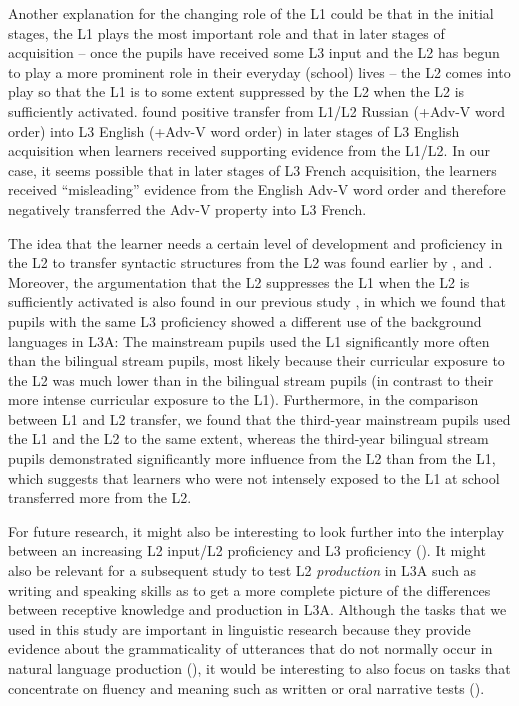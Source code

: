 \documentclass[output=paper]{langsci/langscibook}
\begin{document}
Another explanation for the changing role of the L1 could be that in the initial stages, the L1 plays the most important role and that in later stages of acquisition – once the pupils have received some L3 input and the L2 has begun to play a more prominent role in their everyday (school) lives – the L2 comes into play so that the L1 is to some extent suppressed by the L2 when the L2 is sufficiently activated. \citet{WestergaardEtAl2016} found positive transfer from L1/L2 Russian (+Adv-V word order) into L3 English (+Adv-V word order) in later stages of L3 English acquisition when learners received supporting evidence from the L1/L2. In our case, it seems possible that in later stages of L3 French acquisition, the learners received ``misleading'' evidence from the English Adv-V word order and therefore negatively transferred the Adv-V property into L3 French.

The idea that the learner needs a certain level of development and proficiency in the L2 to transfer syntactic structures from the L2 was found earlier by \citet{BardelFalk2007}, \citet{SánchezBardel2017} and . Moreover, the argumentation that the L2 suppresses the L1 when the L2 is sufficiently activated is also found in our previous study \citep{StadtEtAl2016}, in which we found that pupils with the same L3 proficiency showed a different use of the background languages in L3A: The mainstream pupils used the L1 significantly more often than the bilingual stream pupils, most likely because their curricular exposure to the L2 was much lower than in the bilingual stream pupils (in contrast to their more intense curricular exposure to the L1). Furthermore, in the comparison between L1 and L2 transfer, we found that the third-year mainstream pupils used the L1 and the L2 to the same extent, whereas the third-year bilingual stream pupils demonstrated significantly more influence from the L2 than from the L1, which suggests that learners who were not intensely exposed to the L1 at school transferred more from the L2.

For future research, it might also be interesting to look further into the interplay between an increasing L2 input/L2 proficiency and L3 proficiency (\citealt{BardelLindqvist2007, SánchezBardel2017}). It might also be relevant for a subsequent study to test L2 \textit{production} in L3A such as writing and speaking skills as to get a more complete picture of the differences between receptive knowledge and production in L3A. Although the tasks that we used in this study are important in linguistic research because they provide evidence about the grammaticality of utterances that do not normally occur in natural language production (\citealt{SchützeSprouse2014}), it would be interesting to also focus on tasks that concentrate on fluency and meaning such as written or oral narrative tests (\citealt{EllisR2005, EllisR2009}).
\end{document}
